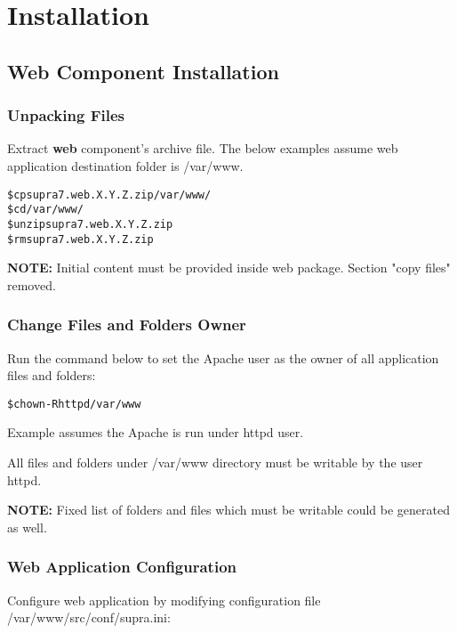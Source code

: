 \documentclass[12pt]{article}
\newcommand{\vigShowNotes}{1}
\newcommand{\vigPackageName}{supra7}
\newcommand{\vigPathToProject}{/var/www}
\newcommand{\vigPathToSrc}{/src}
\newcommand{\note}[1]{
\textbf{NOTE:} 
#1
}
\begin{document}
\section{Installation}

\subsection{Web Component Installation}

\subsubsection{Unpacking Files}

Extract \textbf{web} component's archive file. The below examples assume web application destination folder is \textsf{{\vigPathToProject}}.

\begin{alltt}
\$ cp {\vigPackageName}.web.X.Y.Z.zip \vigPathToProject/
\$ cd \vigPathToProject/
\$ unzip {\vigPackageName}.web.X.Y.Z.zip
\$ rm {\vigPackageName}.web.X.Y.Z.zip
\end{alltt}

\note{Initial content must be provided inside web package. Section "copy files" removed.}

\subsubsection{Change Files and Folders Owner\label{fileOwnerSection}}

Run the command below to set the Apache user as the owner of all application files and folders:

\begin{alltt}
\$ chown -R httpd \vigPathToProject
\end{alltt}

Example assumes the Apache is run under \textsf{httpd} user.

All files and folders under \textsf{\vigPathToProject} directory must be writable by the user \textsf{httpd}.

\note{Fixed list of folders and files which must be writable could be generated as well.}

\subsubsection{Web Application Configuration}
Configure web application by modifying configuration file \textsf{\vigPathToProject\vigPathToSrc/conf/supra.ini}:
\end{document}
